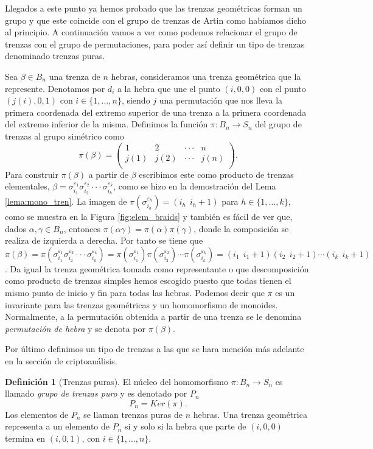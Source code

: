 \documentclass[12pt]{book}
\theoremstyle{definition}
\newtheorem{defi}{Definición}[section]
\begin{document}
Llegados a este punto ya hemos probado que las trenzas geométricas forman un grupo y que este coincide con el grupo de trenzas de Artin como habíamos dicho al principio. A continuación vamos a ver como podemos relacionar el grupo de trenzas con el grupo de permutaciones, para poder así definir un tipo de trenzas denominado trenzas puras.

Sea $\beta\in B_n$ una trenza de $n$ hebras, consideramos una trenza geométrica que la represente. Denotamos por $d_i$ a la hebra que une el punto $(i,0,0)$ con el punto $(j(i),0,1)$ con $i \in\{ 1,\ldots,n\}$, siendo $j$ una permutación que nos lleva la primera coordenada del extremo superior de una trenza a la primera coordenada del extremo inferior de la misma. Definimos la función $\pi:B_n\rightarrow S_n$ del grupo de trenzas al grupo simétrico como
$$\pi(\beta) = \begin{pmatrix}
1 & 2 & \cdot\cdot\cdot & n\\
j(1) & j(2) & \cdot\cdot\cdot & j(n)\\
\end{pmatrix}. $$
Para construir $\pi(\beta)$ a partir de $\beta$ escribimos este como producto de trenzas elementales, $\beta = \sigma_{i_1}^{\varepsilon_1}\sigma_{i_2}^{\varepsilon_2}\cdot\cdot\cdot\sigma_{i_k}^{\varepsilon_k}$, como se hizo en la demostración del Lema \ref{lema:mono_tren}. La imagen de $\pi(\sigma_{i_h}^{\varepsilon_h})=(i_h\ \ i_h+1)$ para $h\in\{1,\ldots,k\}$, como se muestra en la Figura \ref{fig:elem_braids} y también es fácil de ver que, dados $\alpha,\gamma\in B_n$, entonces $\pi(\alpha\gamma)=\pi(\alpha)\pi(\gamma)$, donde la composición se realiza de izquierda a derecha. Por tanto se tiene que $\pi(\beta)=\pi(\sigma_{i_1}^{\varepsilon_1}\sigma_{i_2}^{\varepsilon_2}\cdot\cdot\cdot\sigma_{i_k}^{\varepsilon_k})=\pi(\sigma_{i_1}^{\varepsilon_1})\pi(\sigma_{i_2}^{\varepsilon_2})\cdots \pi(\sigma_{i_k}^{\varepsilon_k})=(i_1\ \ i_1+1)(i_2\ \ i_2+1)\cdots (i_k\ \ i_k+1)$.
Da igual la trenza geométrica tomada como representante o que descomposición como producto de trenzas simples hemos escogido puesto que todas tienen el mismo punto de inicio y fin para todas las hebras. Podemos decir que $\pi$ es un invariante para las trenzas geométricas y un homomorfismo de monoides. Normalmente, a la permutación obtenida a partir de una trenza se le denomina \textit{permutación de hebra} y se denota por $\pi(\beta)$.

Por último definimos un tipo de trenzas a las que se hara mención más adelante en la sección de criptoanálisis.
\begin{defi}[Trenzas puras]
El núcleo del homomorfismo $\pi:B_n\rightarrow S_n$ es llamado \textit{grupo de trenzas puro} y es denotado por $P_n$
$$P_n = Ker(\pi).$$
Los elementos de $P_n$ se llaman trenzas puras de $n$ hebras. Una trenza geométrica representa a un elemento de $P_n$ si y solo si la hebra que parte de $(i,0,0)$ termina en $(i,0,1)$, con $i \in\{ 1,\ldots,n\}$.

\end{defi}
\end{document}
